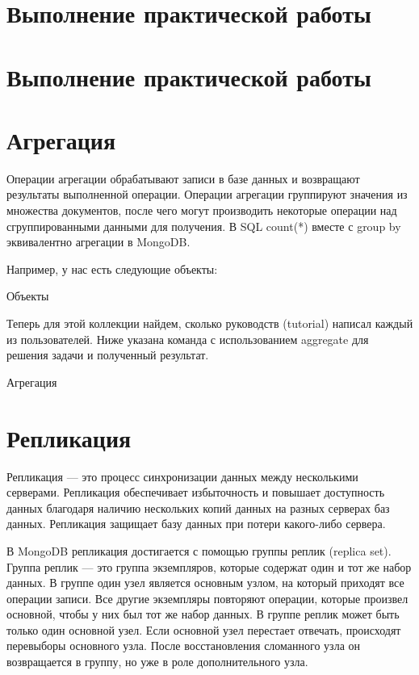\graphicspath{{img}} %
\section*{\LARGE Выполнение практической работы}

\section*{\LARGE Выполнение практической работы}

\section{Агрегация}

Операции агрегации обрабатывают записи в базе данных и возвращают
результаты выполненной операции. Операции агрегации группируют значения
из множества документов, после чего могут производить некоторые операции
над сгруппированными данными для получения. В SQL count(*) вместе с group
by эквивалентно агрегации в MongoDB.

Например, у нас есть следующие объекты:
\begin{image}
	\caption{Объекты}
	\label{fig:object}
\end{image}

Теперь для этой коллекции найдем, сколько руководств (tutorial) написал
каждый из пользователей. Ниже указана команда с использованием aggregate
для решения задачи и полученный результат.
\begin{image}
	\caption{Агрегация}
	\label{fig:aggregate}
\end{image}


\section{Репликация}

Репликация --- это процесс синхронизации данных между несколькими
серверами. Репликация обеспечивает избыточность и повышает доступность
данных благодаря наличию нескольких копий данных на разных серверах баз
данных. Репликация защищает базу данных при потери какого-либо сервера.\par
В MongoDB репликация достигается с помощью группы реплик (replica
set). Группа реплик --- это группа экземпляров, которые содержат один и тот же
набор данных. В группе один узел является основным узлом, на который
приходят все операции записи. Все другие экземпляры повторяют операции,
которые произвел основной, чтобы у них был тот же набор данных. В группе
реплик может быть только один основной узел. Если основной узел перестает
отвечать, происходят перевыборы основного узла. После восстановления
сломанного узла он возвращается в группу, но уже в роле дополнительного
узла.

